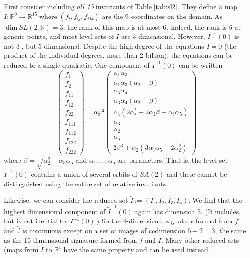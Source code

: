 \documentclass{article}
\def\R{\mathbb{R}}
\begin{document}
First consider including {\em all 15} invariants of Table \ref{tab:sl2}. They define
a map $I\colon \mathbb{R}^9\to \mathbb{R}^{15}$ where 
$(f_i,f_{ij},f_{ijk})$ are the 9 coordinates on the domain. As $\dim SL(2,\mathbb{R})=3$, 
the rank of this map is at most 6. Indeed, the rank is 6 at generic points, and
most level sets of $I$ are 3-dimensional.
However, $I^{-1}(0)$ is not 3-, but 5-dimensional. 
Despite the high degree of the equations $I=0$ (the product of the individual
degrees, more than 2 billion), the equations can be reduced to a single quadratic.
One component of $I^{-1}(0)$ can be written
$$ \begin{pmatrix}f_1 \\f_2 \\f_{11} \\f_{12} \\f_{22} \\f_{111} \\f_{112} \\f_{122} \\f_{222}\end{pmatrix}=
\alpha_3^{-2}\begin{pmatrix}\alpha_1\alpha_3\\
 \alpha_1\alpha_3(\alpha_2-\beta)\\ 
 \alpha_3\alpha_4\\
\alpha_3\alpha_4(\alpha_2-\beta)\\
\alpha_4(2\alpha_2^2-2\alpha_2\beta - \alpha_3\alpha_5)\\
\alpha_3\\
\alpha_2\\
\alpha_5\\
2\beta^3 + \alpha_2(3\alpha_3\alpha_5 - 2\alpha_2^2)
\end{pmatrix}$$
where $\beta=\sqrt{\alpha_2^2-\alpha_3\alpha_5}$ and
$\alpha_1,\dots,\alpha_5$ are parameters.
That is, the level set $I^{-1}(0)$ contains a union of several orbits of $SA(2)$ and these
cannot be distinguished using the entire set of relative invariants.

Likewise, we can consider the reduced set $\widetilde I := (I_1,I_2,I_3,I_4)$. 
We find that the highest dimensional component of $\widetilde{I}^{-1}(0)$ 
again has dimension 5. (It includes, but is not idential to, $I^{-1}(0)$.) 
So the 4-dimensional signature formed from $f$ and $\widetilde I$
is continuous except on a set of images of codimension $5-2=3$, the same 
as  the 15-dimensional signature formed from $f$ and $I$. 
Many other reduced sets (maps from $\widetilde{I}$ to $\R^4$ have the same property
and can be used instead.
\end{document}
